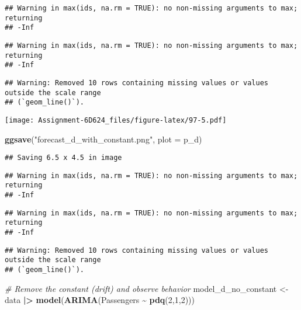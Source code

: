 \documentclass[
]{article}
\newenvironment{Shaded}{\begin{snugshade}}{\end{snugshade}}
\newcommand{\AttributeTok}[1]{\textcolor[rgb]{0.13,0.29,0.53}{#1}}
\newcommand{\CommentTok}[1]{\textcolor[rgb]{0.56,0.35,0.01}{\textit{#1}}}
\newcommand{\DecValTok}[1]{\textcolor[rgb]{0.00,0.00,0.81}{#1}}
\newcommand{\FunctionTok}[1]{\textcolor[rgb]{0.13,0.29,0.53}{\textbf{#1}}}
\newcommand{\NormalTok}[1]{#1}
\newcommand{\OtherTok}[1]{\textcolor[rgb]{0.56,0.35,0.01}{#1}}
\newcommand{\SpecialCharTok}[1]{\textcolor[rgb]{0.81,0.36,0.00}{\textbf{#1}}}
\newcommand{\StringTok}[1]{\textcolor[rgb]{0.31,0.60,0.02}{#1}}
\begin{document}
\begin{verbatim}
## Warning in max(ids, na.rm = TRUE): no non-missing arguments to max; returning
## -Inf
\end{verbatim}

\begin{verbatim}
## Warning in max(ids, na.rm = TRUE): no non-missing arguments to max; returning
## -Inf
\end{verbatim}

\begin{verbatim}
## Warning: Removed 10 rows containing missing values or values outside the scale range
## (`geom_line()`).
\end{verbatim}

\texttt{[image: Assignment-6D624\_files/figure-latex/97-5.pdf]}

\begin{Shaded}
\begin{Highlighting}[]
\FunctionTok{ggsave}\NormalTok{(}\StringTok{"forecast\_d\_with\_constant.png"}\NormalTok{, }\AttributeTok{plot =}\NormalTok{ p\_d)}
\end{Highlighting}
\end{Shaded}

\begin{verbatim}
## Saving 6.5 x 4.5 in image
\end{verbatim}

\begin{verbatim}
## Warning in max(ids, na.rm = TRUE): no non-missing arguments to max; returning
## -Inf
\end{verbatim}

\begin{verbatim}
## Warning in max(ids, na.rm = TRUE): no non-missing arguments to max; returning
## -Inf
\end{verbatim}

\begin{verbatim}
## Warning: Removed 10 rows containing missing values or values outside the scale range
## (`geom_line()`).
\end{verbatim}

\begin{Shaded}
\begin{Highlighting}[]
\CommentTok{\# Remove the constant (drift) and observe behavior}
\NormalTok{model\_d\_no\_constant }\OtherTok{\textless{}{-}}\NormalTok{ data }\SpecialCharTok{|\textgreater{}} \FunctionTok{model}\NormalTok{(}\FunctionTok{ARIMA}\NormalTok{(Passengers }\SpecialCharTok{\textasciitilde{}} \FunctionTok{pdq}\NormalTok{(}\DecValTok{2}\NormalTok{,}\DecValTok{1}\NormalTok{,}\DecValTok{2}\NormalTok{)))}
\end{Highlighting}
\end{Shaded}
\end{document}
